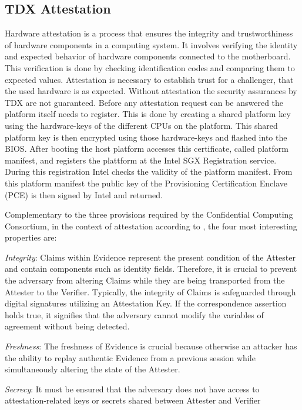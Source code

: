 \subsection{TDX Attestation}
\label{TDX attestation}
Hardware attestation is a process that ensures the integrity and trustworthiness of hardware components in a computing system. It involves verifying the identity and expected behavior of hardware components connected to the motherboard. This verification is done by checking identification codes and comparing them to expected values. Attestation is necessary to establish trust for a challenger, that the used hardware is as expected. Without attestation the security assurances by TDX are not guaranteed. 
\label{Pre-Attestation setup}
Before any attestation request can be answered the platform itself needs to register. This is done by creating a shared platform key using the hardware-keys of the different CPUs on the platform. This shared platform key is then encrypted using those hardware-keys and flashed into the BIOS. After booting the host platform accesses this certificate, called platform manifest, and registers the plattform at the Intel SGX Registration service. During this registration Intel checks the validity of the platform manifest. From this platform manifest the public key of the Provisioning Certification Enclave (PCE) is then signed by Intel and returned.

Complementary to the three provisions required by the Confidential Computing Consortium, in the context of attestation according to \cite{sardar_demystifying_2021}, the four most interesting properties are:

\label{FourProperties}
\textit{Integrity}: Claims within Evidence represent the present condition of the Attester and contain components such as identity fields. Therefore, it is crucial to prevent the adversary from altering Claims while they are being transported from the Attester to the Verifier. Typically, the integrity of Claims is safeguarded through digital signatures utilizing an Attestation Key. If the correspondence assertion holds true, it signifies that the adversary cannot modify the variables of agreement without being detected. 

\textit{Freshness}: The freshness of Evidence is crucial because otherwise an attacker has the ability to replay authentic Evidence from a previous session while simultaneously altering the state of the Attester.

\textit{Secrecy}: It must be ensured that the adversary does not have access to attestation-related keys or secrets shared between Attester and Verifier


